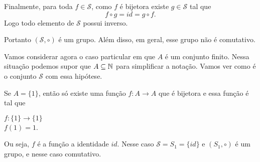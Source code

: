 \documentclass{beamer}
\begin{document}
    \begin{frame}

        Finalmente, para toda $f \in \mathcal{S}$, como $f$ é bijetora existe $g \in \mathcal{S}$ tal que
        \[
            f\circ g = id = g \circ f.
        \]
        Logo todo elemento de $\mathcal{S}$ possui inverso.

        \vspace{.3cm}

        Portanto $(\mathcal{S}, \circ)$ \'e um grupo. Al\'em disso, em geral, esse grupo n\~ao \'e comutativo.

        \vspace{.3cm}

        Vamos considerar agora o caso particular em que $A$ é um conjunto finito. Nessa situação podemos supor que $A \subseteq \mathbb{N}$ para simplificar a nota\c{c}\~ao. Vamos ver como é o conjunto $\mathcal{S}$ com essa hipótese.

    \end{frame}

    \begin{frame}
        Se $A = \{1\}$, ent\~ao s\'o existe uma fun\c{c}\~ao $f : A \to A$ que \'e bijetora e essa fun\c{c}\~ao \'e tal que
        \begin{center}
            $f : \{1\} \to \{1\}$\\
            $f(1) = 1$.
        \end{center}
        Ou seja, $f$ é a função a identidade $id$. Nesse caso $\mathcal{S} = S_1 = \{id\}$ e $(S_1, \circ)$ \'e um grupo, e nesse caso comutativo.
    \end{frame}
    
\end{document}
